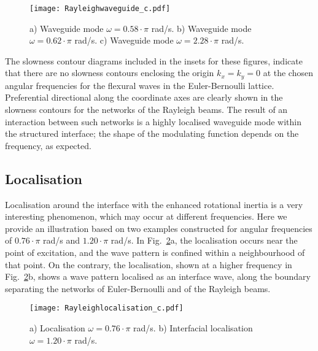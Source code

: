 \documentclass[11pt]{article}
\begin{document}
\begin{figure}[!htb]
\centering
\texttt{[image: Rayleighwaveguide\_c.pdf]}
\caption{\footnotesize
a) Waveguide mode $\omega=0.58\!\cdot\!\pi$ rad/s. b) Waveguide mode $\omega=0.62\!\cdot\!\pi$ rad/s. c) Waveguide mode $\omega=2.28\!\cdot\!\pi$ rad/s.}
\label{Rayleighwaveguide}
\end{figure}

The slowness contour diagrams included in the insets for these figures, indicate that there are no slowness contours enclosing the origin $k_x=k_y=0$ at the chosen angular frequencies for the flexural waves in the Euler-Bernoulli lattice. Preferential directional along the coordinate axes are clearly shown in the slowness contours for the networks of the Rayleigh beams. The result of an interaction between such networks is a highly localised waveguide mode within the structured interface; the shape of the modulating function depends on the frequency, as expected.

\newpage

\subsection{Localisation}

Localisation around the interface with the enhanced rotational inertia is a very interesting phenomenon, which may occur at different frequencies. Here we provide an illustration based on two examples constructed for angular frequencies of $0.76\!\cdot\!\pi$ rad/s and $1.20\!\cdot\!\pi$ rad/s. In Fig.~\ref{Rayleighlocalisation}a, the localisation occurs near the point of excitation, and the wave pattern is confined within a neighbourhood of that point. On the contrary, the localisation, shown at a higher frequency in Fig.~\ref{Rayleighlocalisation}b, shows a wave pattern localised as an interface wave, along the boundary separating the networks of Euler-Bernoulli and of the Rayleigh beams.

\begin{figure}[!htb]
\centering
\texttt{[image: Rayleighlocalisation\_c.pdf]}
\caption{\footnotesize
a) Localisation $\omega=0.76\!\cdot\!\pi$ rad/s. b) Interfacial localisation $\omega=1.20\!\cdot\!\pi$ rad/s.}
\label{Rayleighlocalisation}
\end{figure}
\end{document}
